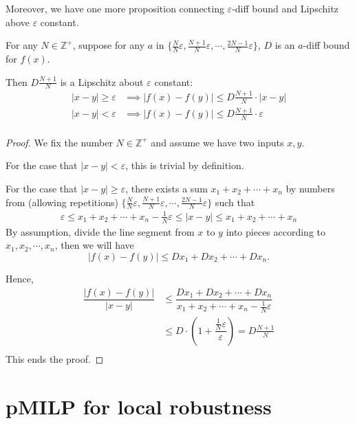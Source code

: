 \documentclass{llncs}
\begin{document}
	Moreover, we have one more proposition connecting $\varepsilon$-diff bound and Lipschitz above $\varepsilon$ constant.
	
	
	\begin{proposition}
		For any $N\in\mathbb{Z}^+$, suppose for any $a$ in $\{\frac{N}{N}\varepsilon,\frac{N+1}{N}\varepsilon,\cdots, \frac{2N-1}{N}\varepsilon\}$, $D$ is an $a$-diff bound for $f(x)$. 
		
		Then $D\frac{N+1}{N}$ is a Lipschitz about $\varepsilon$ constant:\begin{align*}
			|x-y|\geq \varepsilon &\implies |f(x)-f(y)| \leq D\frac{N+1}{N} \cdot |x-y|\\
			|x-y|<\varepsilon &\implies |f(x)-f(y)| \leq D\frac{N+1}{N} \cdot \varepsilon\\
		\end{align*}
	\end{proposition}
	\begin{proof}
		We fix the number $N\in\mathbb{Z}^+$ and assume we have two inputs $x, y$.
		
		For the case that $|x-y|<\varepsilon$, this is trivial by definition.
		
		For the case that $|x-y|\geq \varepsilon$, there exists a sum $x_1+x_2+\cdots+x_n$ by numbers from (allowing repetitions) $\{\frac{N}{N}\varepsilon,\frac{N+1}{N}\varepsilon,\cdots, \frac{2N-1}{N}\varepsilon\}$ such that \begin{align*}
			\varepsilon \leq x_1+x_2+\cdots+x_n -\frac{1}{N}\varepsilon \leq |x-y| \leq x_1+x_2+\cdots+x_n
		\end{align*}
		By assumption, divide the line segment from $x$ to $y$ into pieces according to $x_1, x_2,\cdots,x_n$, then we will have $$|f(x)-f(y)|\leq Dx_1+Dx_2+\cdots+Dx_n.$$
		
			Hence,\begin{align*}
			\dfrac{|f(x)-f(y)|}{|x-y|} &\leq \dfrac{Dx_1+Dx_2+\cdots+Dx_n}{x_1+x_2+\cdots+x_n -\frac{1}{N}\varepsilon}\\
			& \leq D\cdot( 1+  \dfrac{\frac{1}{N}\varepsilon}{\varepsilon})= D \frac{N+1}{N}\\
		\end{align*}
		This ends the proof.
	\end{proof}
	
	
	
	\section{pMILP for local robustness}
	
\end{document}
